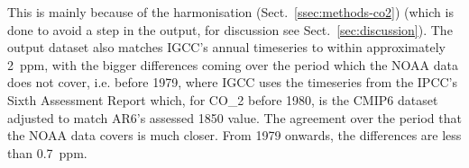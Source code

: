 This is mainly because of the harmonisation (Sect.~\ref{ssec:methods-co2})
(which is done to avoid a step in the output, for discussion see Sect.~\ref{sec:discussion}).
The output dataset also matches IGCC's annual timeseries \citep{forster_igcc_2026,smith_igcc-forcings_2026} to within approximately 2~ppm,
with the bigger differences coming over the period which the NOAA data does not cover,
i.e. before 1979, where IGCC uses the timeseries from the IPCC's Sixth Assessment Report \citep[AR6,][]{IPCC_AR6-WG1-Annex-III_2021}
which, for CO_2 before 1980, is the CMIP6 dataset adjusted to match AR6's assessed 1850 value.
The agreement over the period that the NOAA data covers is much closer.
From 1979 onwards, the differences are less than 0.7~ppm.
